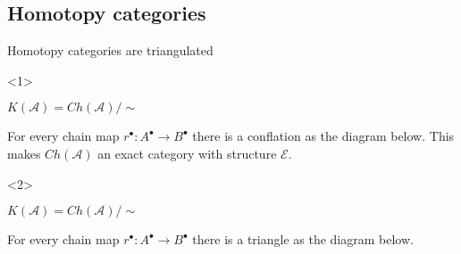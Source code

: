 \documentclass{beamer}
\newcommand{\chain}[1]{#1^{\bullet}}
\begin{document}
        \subsection{Homotopy categories}
            \begin{frame}{Homotopy categories are triangulated}
                \begin{onlyenv}<1>
                    \begin{definition}
                        $K(\mathcal{A})=Ch(\mathcal{A})/\sim$
                    \end{definition}
                    \begin{lemma}
                        For every chain map $\chain{r}:\chain{A}\rightarrow\chain{B}$ there is a conflation as the diagram below. This makes $Ch(\mathcal{A})$ an exact category with structure $\mathcal{E}$.
                        \begin{center}
                        \end{center}
                    \end{lemma}
                \end{onlyenv}
                \begin{onlyenv}<2>
                    \begin{definition}
                        $K(\mathcal{A})=Ch(\mathcal{A})/\sim$
                    \end{definition}
                    \begin{lemma}
                        For every chain map $\chain{r}:\chain{A}\rightarrow\chain{B}$ there is a triangle as the diagram below.
                        \begin{center}
                        \end{center}
                    \end{lemma}
                \end{onlyenv}
            \end{frame}
\end{document}
